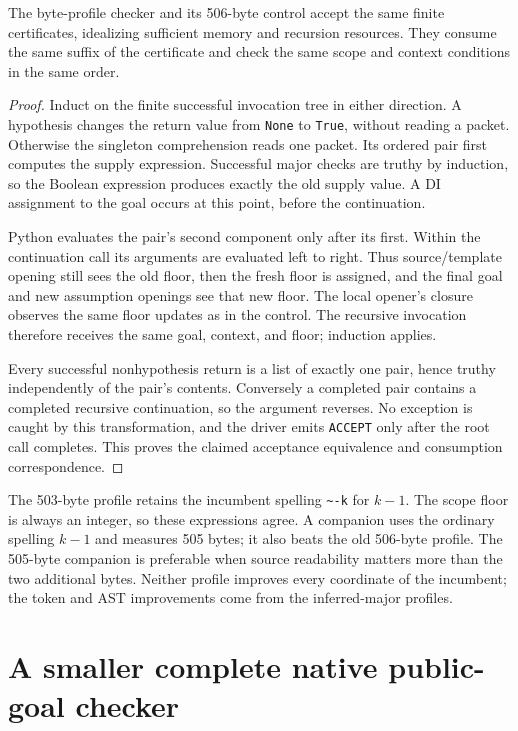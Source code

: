 \begin{theorem}
The byte-profile checker and its 506-byte control accept the same finite
certificates, idealizing sufficient memory and recursion resources. They
consume the same suffix of the certificate and check the same scope and
context conditions in the same order.
\end{theorem}
\begin{proof}
Induct on the finite successful invocation tree in either direction.
A hypothesis changes the return value from \texttt{None} to
\texttt{True}, without reading a packet. Otherwise the singleton
comprehension reads one packet. Its ordered pair first computes the supply
expression. Successful major checks are truthy by induction, so the
Boolean expression produces exactly the old supply value. A DI assignment
to the goal occurs at this point, before the continuation.

Python evaluates the pair's second component only after its first.
Within the continuation call its arguments are evaluated left to right.
Thus source/template opening still sees the old floor, then the fresh
floor is assigned, and the final goal and new assumption openings see
that new floor. The local opener's closure observes the same floor
updates as in the control. The recursive invocation therefore receives
the same goal, context, and floor; induction applies.

Every successful nonhypothesis return is a list of exactly one pair, hence
truthy independently of the pair's contents. Conversely a completed pair
contains a completed recursive continuation, so the argument reverses.
No exception is caught by this transformation, and the driver emits
\texttt{ACCEPT} only after the root call completes. This proves the
claimed acceptance equivalence and consumption correspondence.
\end{proof}

The 503-byte profile retains the incumbent spelling \texttt{\~{}-k} for
$k-1$. The scope floor is always an integer, so these expressions agree.
A companion uses the ordinary spelling $k-1$ and measures 505 bytes;
it also beats the old 506-byte profile. The 505-byte companion is preferable
when source readability matters more than the two additional bytes.
Neither profile improves every coordinate of the incumbent; the token
and AST improvements come from the inferred-major profiles.

\section{A smaller complete native public-goal checker}
\label{sec:native-proof}

